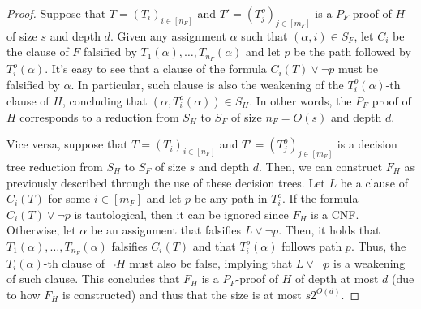 \begin{proof}
 Suppose that $T = (T_i)_{i \in [n_F]}$ and $T' = (T_j^o)_{j \in [m_F]}$ is a $P_F$ proof of $H$ of size $s$ and depth $d$. Given any assignment $\alpha$ such that $(\alpha, i) \in S_F$, let $C_i$ be the clause of $F$ falsified by $T_1(\alpha), \ldots, T_{n_F}(\alpha)$ and let $p$ be the path followed by $T_i^o(\alpha)$. It's easy to see that a clause of the formula $C_i(T) \lor \lnot{p}$ must be falsified by $\alpha$. In particular, such clause is also the weakening of the $T_i^o(\alpha)$-th clause of $H$, concluding that $(\alpha, T_i^o(\alpha)) \in S_H$. In other words, the $P_F$ proof of $H$ corresponds to a reduction from $S_H$ to $S_F$ of size $n_F = O(s)$ and depth $d$.

 Vice versa, suppose that $T = (T_i)_{i \in [n_F]}$ and $T' = (T_j^o)_{j \in [m_F]}$ is a decision tree reduction from $S_H$ to $S_F$ of size $s$ and depth $d$. Then, we can construct $F_H$ as previously described through the use of these decision trees. Let $L$ be a clause of $C_i(T)$ for some $i \in [m_F]$ and let $p$ be any path in $T_i^o$. If the formula $C_i(T) \lor \lnot{p}$ is tautological, then it can be ignored since $F_H$ is a CNF. Otherwise, let $\alpha$ be an assignment that falsifies $L \lor \lnot{p}$. Then, it holds that $T_1(\alpha), \ldots, T_{n_F}(\alpha)$ falsifies $C_i(T)$ and that $T_i^o(\alpha)$ follows path $p$. Thus, the $T_i(\alpha)$-th clause of $\lnot{H}$ must also be false, implying that $L \lor \lnot{p}$ is a weakening of such clause. This concludes that $F_H$ is a $P_F$-proof of $H$ of depth at most $d$ (due to how $F_H$ is constructed) and thus that the size is at most $s2^{O(d)}$.

\end{proof}

\cleardoublepage
